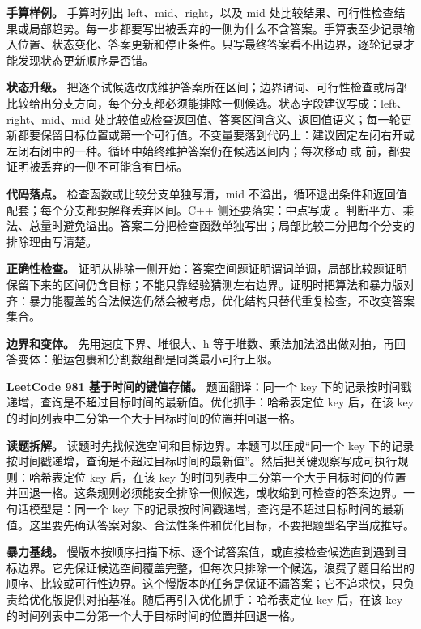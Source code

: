 \textbf{手算样例。} 手算时列出 left、mid、right，以及 mid 处比较结果、可行性检查结果或局部趋势。每一步都要写出被丢弃的一侧为什么不含答案。手算表至少记录输入位置、状态变化、答案更新和停止条件。只写最终答案看不出边界，逐轮记录才能发现状态更新顺序是否错。

\textbf{状态升级。} 把逐个试候选改成维护答案所在区间；边界谓词、可行性检查或局部比较给出分支方向，每个分支都必须能排除一侧候选。状态字段建议写成：left、right、mid、mid 处比较值或检查返回值、答案区间含义、返回值语义；每一轮更新都要保留目标位置或第一个可行值。不变量要落到代码上：建议固定左闭右开或左闭右闭中的一种。循环中始终维护答案仍在候选区间内；每次移动  或  前，都要证明被丢弃的一侧不可能含有目标。

\textbf{代码落点。} 检查函数或比较分支单独写清，mid 不溢出，循环退出条件和返回值配套；每个分支都要解释丢弃区间。C++ 侧还要落实：中点写成 。判断平方、乘法、总量时避免溢出。答案二分把检查函数单独写出；局部比较二分把每个分支的排除理由写清楚。

\textbf{正确性检查。} 证明从排除一侧开始：答案空间题证明谓词单调，局部比较题证明保留下来的区间仍含目标；不能只靠经验猜测左右边界。证明时把算法和暴力版对齐：暴力能覆盖的合法候选仍然会被考虑，优化结构只替代重复检查，不改变答案集合。

\textbf{边界和变体。} 先用速度下界、堆很大、h 等于堆数、乘法加法溢出做对拍，再回答变体：船运包裹和分割数组都是同类最小可行上限。

\noindent\textbf{LeetCode 981 基于时间的键值存储。} 题面翻译：同一个 key 下的记录按时间戳递增，查询是不超过目标时间的最新值。优化抓手：哈希表定位 key 后，在该 key 的时间列表中二分第一个大于目标时间的位置并回退一格。

\textbf{读题拆解。} 读题时先找候选空间和目标边界。本题可以压成“同一个 key 下的记录按时间戳递增，查询是不超过目标时间的最新值”。然后把关键观察写成可执行规则：哈希表定位 key 后，在该 key 的时间列表中二分第一个大于目标时间的位置并回退一格。这条规则必须能安全排除一侧候选，或收缩到可检查的答案边界。一句话模型是：同一个 key 下的记录按时间戳递增，查询是不超过目标时间的最新值。这里要先确认答案对象、合法性条件和优化目标，不要把题型名字当成推导。

\textbf{暴力基线。} 慢版本按顺序扫描下标、逐个试答案值，或直接检查候选直到遇到目标边界。它先保证候选空间覆盖完整，但每次只排除一个候选，浪费了题目给出的顺序、比较或可行性边界。这个慢版本的任务是保证不漏答案；它不追求快，只负责给优化版提供对拍基准。随后再引入优化抓手：哈希表定位 key 后，在该 key 的时间列表中二分第一个大于目标时间的位置并回退一格。

